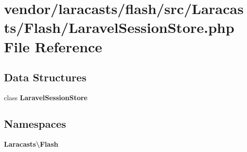 \section{vendor/laracasts/flash/src/\+Laracasts/\+Flash/\+Laravel\+Session\+Store.php File Reference}
\label{_laravel_session_store_8php}
\subsection*{Data Structures}
\begin{DoxyCompactItemize}
\item 
class {\bf Laravel\+Session\+Store}
\end{DoxyCompactItemize}
\subsection*{Namespaces}
\begin{DoxyCompactItemize}
\item 
 {\bf Laracasts\textbackslash{}\+Flash}
\end{DoxyCompactItemize}
